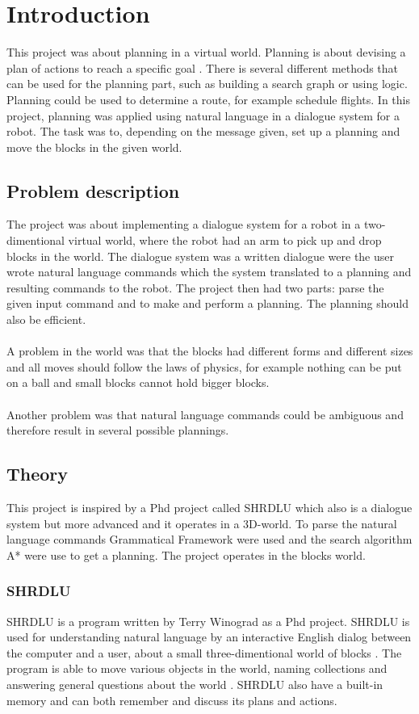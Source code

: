 \chapter{Introduction}
This project was about planning in a virtual world. Planning is about devising a plan of actions to reach a specific goal \citep{planning_ai}. There is several different methods that can be used for the planning part, such as building a search graph or using logic. 
Planning could be used to determine a route, for example schedule flights. In this project, planning was applied using natural language in a dialogue system for a robot. The task was to, depending on the message given, set up a planning and move the blocks in the given world.

\section{Problem description}
The project was about implementing a dialogue system for a robot in a two-dimentional virtual world, where the robot had an arm to pick up and drop blocks in the world. The dialogue system was a written dialogue were the user wrote natural language commands which the system translated to a planning and resulting commands to the robot. The project then had two parts: parse the given input command and to make and perform a planning. The planning should also be efficient. \\\\
A problem in the world was that the blocks had different forms and different sizes and all moves should follow the laws of physics, for example nothing can be put on a ball and small blocks cannot hold bigger blocks. \\\\
Another problem was that natural language commands could be ambiguous and therefore result in several possible plannings.

\section{Theory}
This project is inspired by a Phd project called SHRDLU which also is a dialogue system but more advanced and it operates in a 3D-world. To parse the natural language commands Grammatical Framework were used and the search algorithm A* were use to get a planning. The project operates in the blocks world.

\subsection{SHRDLU}
SHRDLU is a program written by Terry Winograd as a Phd project. SHRDLU is used for understanding natural language by an interactive English dialog between the computer and a user, about a small three-dimentional world of blocks \citep{SHRDLU_url}. The program is able to move various objects in the world, naming collections and answering general questions about the world \citep{SHRDLU_url}. SHRDLU also have a built-in memory and can both remember and discuss its plans and actions.


